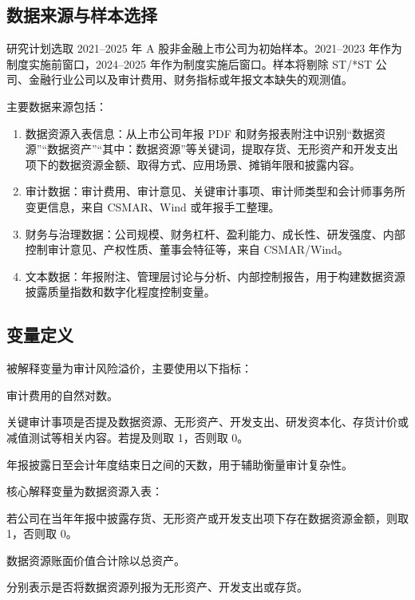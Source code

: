 \documentclass[UTF8,zihao=-4,a4paper]{ctexart}
\begin{document}
\subsection{数据来源与样本选择}

研究计划选取 2021--2025 年 A 股非金融上市公司为初始样本。2021--2023 年作为制度实施前窗口，2024--2025 年作为制度实施后窗口。样本将剔除 ST/*ST 公司、金融行业公司以及审计费用、财务指标或年报文本缺失的观测值。

主要数据来源包括：

\begin{enumerate}[label=(\arabic*)]
  \item 数据资源入表信息：从上市公司年报 PDF 和财务报表附注中识别``数据资源''``数据资产''``其中：数据资源''等关键词，提取存货、无形资产和开发支出项下的数据资源金额、取得方式、应用场景、摊销年限和披露内容。
  \item 审计数据：审计费用、审计意见、关键审计事项、审计师类型和会计师事务所变更信息，来自 CSMAR、Wind 或年报手工整理。
  \item 财务与治理数据：公司规模、财务杠杆、盈利能力、成长性、研发强度、内部控制审计意见、产权性质、董事会特征等，来自 CSMAR/Wind。
  \item 文本数据：年报附注、管理层讨论与分析、内部控制报告，用于构建数据资源披露质量指数和数字化程度控制变量。
\end{enumerate}

\subsection{变量定义}

被解释变量为审计风险溢价，主要使用以下指标：

\begin{description}[leftmargin=7em,style=nextline]
  \item[AuditFee] 审计费用的自然对数。
  \item[KAM\_Data] 关键审计事项是否提及数据资源、无形资产、开发支出、研发资本化、存货计价或减值测试等相关内容。若提及则取 1，否则取 0。
  \item[AuditDelay] 年报披露日至会计年度结束日之间的天数，用于辅助衡量审计复杂性。
\end{description}

核心解释变量为数据资源入表：

\begin{description}[leftmargin=7em,style=nextline]
  \item[DataEntry] 若公司在当年年报中披露存货、无形资产或开发支出项下存在数据资源金额，则取 1，否则取 0。
  \item[DataRatio] 数据资源账面价值合计除以总资产。
  \item[DataIA、DataDev、DataInv] 分别表示是否将数据资源列报为无形资产、开发支出或存货。
\end{description}
\end{document}
